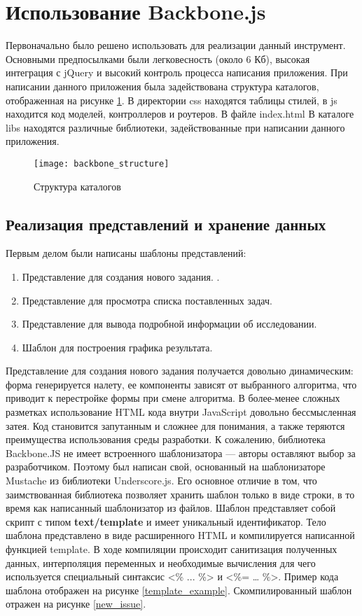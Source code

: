 \section{Использование Backbone.js}
Первоначально было решено использовать для реализации данный инструмент. Основными предпосылками были легковесность (около 6 Кб), высокая интеграция с jQuery и высокий контроль процесса написания приложения. При написании данного приложения была задействована структура каталогов, отображенная на рисунке \ref{backbone_structure}. В директории css находятся таблицы стилей, в js находится код моделей, контроллеров и роутеров. В файле index.html  В каталоге libs находятся различные библиотеки, задействованные при написании данного приложения.

\begin{figure}[h]
\center\texttt{[image: backbone\_structure]}
\caption{Структура каталогов}\label{backbone_structure}
\end{figure}

\subsection{Реализация представлений и хранение данных}

Первым делом были написаны шаблоны представлений:

\begin{enumerate}
 \item Представление для создания нового задания. .
 \item Представление для просмотра списка поставленных задач.
 \item Представление для вывода подробной информации об исследовании.
 \item Шаблон для построения графика результата.
\end{enumerate}

Представление для создания нового задания получается довольно динамическим: форма генерируется налету, ее компоненты зависят от выбранного алгоритма, что приводит к перестройке формы при смене алгоритма. В более-менее сложных разметках использование HTML кода внутри JavaScript довольно бессмысленная затея. Код становится запутанным и сложнее для понимания, а также теряются преимущества использования среды разработки. К сожалению, библиотека Backbone.JS не имеет встроенного шаблонизатора --- авторы оставляют выбор за разработчиком. Поэтому был написан свой, основанный на шаблонизаторе Mustache из библиотеки Underscore.js. Его основное отличие в том, что заимствованная библиотека позволяет хранить шаблон только в виде строки, в то время как написанный шаблонизатор из файлов. Шаблон представляет собой скрипт с типом \textbf{text/template} и имеет уникальный идентификатор. Тело шаблона представлено в виде расширенного HTML и компилируется написанной функцией template. В ходе компиляции происходит санитизация полученных данных, интерполяция переменных и необходимые вычисления для чего используется специальный синтаксис <\% ... \%> и <\%= … \%>. Пример кода шаблона отображен на рисунке \ref{template_example}. Скомпилированный шаблон отражен на рисунке \ref{new_issue}.

